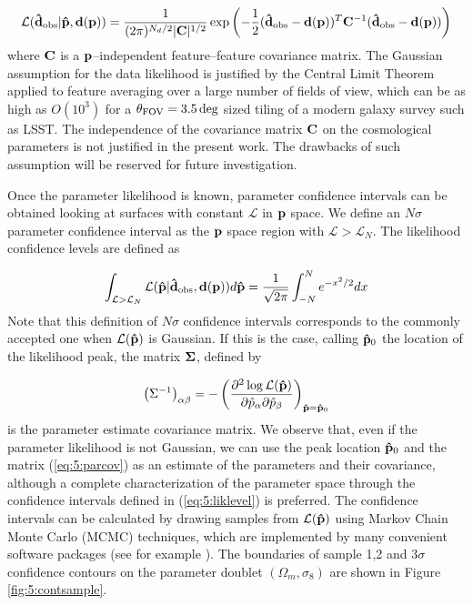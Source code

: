\begin{equation}
\label{eq:5:gaussfeatlik}
\mathcal{L}(\mathbf{\hat{d}}_{\rm obs}\vert\mathbf{\hat{p}},\mathbf{d}(\mathbf{p})) = \frac{1}{(2\pi)^{N_d/2}\vert\mathbf{C}\vert^{1/2}}\exp\left(-\frac{1}{2}(\mathbf{\hat{d}}_{\rm obs}-\mathbf{d}(\mathbf{p}))^T\mathbf{C}^{-1}(\mathbf{\hat{d}}_{\rm obs}-\mathbf{d}(\mathbf{p}))\right) 
\end{equation}
%
where $\mathbf{C}$ is a $\mathbf{p}$--independent feature--feature covariance matrix. The Gaussian assumption for the data likelihood is justified by the Central Limit Theorem applied to feature averaging over a large number of fields of view, which can be as high as $O(10^3)$ for a $\theta_{\rm FOV}=3.5\,{\rm deg}$ sized tiling of a modern galaxy survey such as LSST. The independence of the covariance matrix $\mathbf{C}$ on the cosmological parameters is not justified in the present work. The drawbacks of such assumption will be reserved for future investigation. 

Once the parameter likelihood is known, parameter confidence intervals can be obtained looking at surfaces with constant $\mathcal{L}$ in $\mathbf{p}$ space. We define an $N\sigma$ parameter confidence interval as the $\mathbf{p}$ space region with $\mathcal{L}>\mathcal{L}_N$. The likelihood confidence levels are defined as 

\begin{equation}
\label{eq:5:liklevel}
\int_{\mathcal{L}>\mathcal{L}_N}\mathcal{L}(\mathbf{\hat{p}}\vert\mathbf{\hat{d}}_{\rm obs},\mathbf{d}(\mathbf{p})) d\mathbf{\hat{p}} = \frac{1}{\sqrt{2\pi}}\int_{-N}^Ne^{-x^2/2}dx
\end{equation}  
%
Note that this definition of $N\sigma$ confidence intervals corresponds to the commonly accepted one when $\mathcal{L}(\mathbf{\hat{p}})$ is Gaussian. If this is the case, calling $\mathbf{\hat{p}}_0$ the location of the likelihood peak, the matrix $\mathbf{\Sigma}$, defined by

\begin{equation}
\label{eq:5:parcov}
\left(\Sigma^{-1}\right)_{\alpha\beta} = -\left(\frac{\partial^2\log\mathcal{L}(\mathbf{\hat{p}})}{\partial\hat{p}_\alpha\partial\hat{p}_\beta}\right)_{\mathbf{\hat{p}}=\mathbf{\hat{p}}_0}
\end{equation}
%
is the parameter estimate covariance matrix. We observe that, even if the parameter likelihood is not Gaussian, we can use the peak location $\mathbf{\hat{p}}_0$ and the matrix (\ref{eq:5:parcov}) as an estimate of the parameters and their covariance, although a complete characterization of the parameter space through the confidence intervals defined in (\ref{eq:5:liklevel}) is preferred. The confidence intervals can be calculated by drawing samples from $\mathcal{L}(\mathbf{\hat{p}})$ using Markov Chain Monte Carlo (MCMC) techniques, which are implemented by many convenient software packages (see for example \citep{emcee}). The boundaries of sample 1,2 and 3$\sigma$ confidence contours on the parameter doublet $(\Omega_m,\sigma_8)$ are shown in Figure \ref{fig:5:contsample}.

